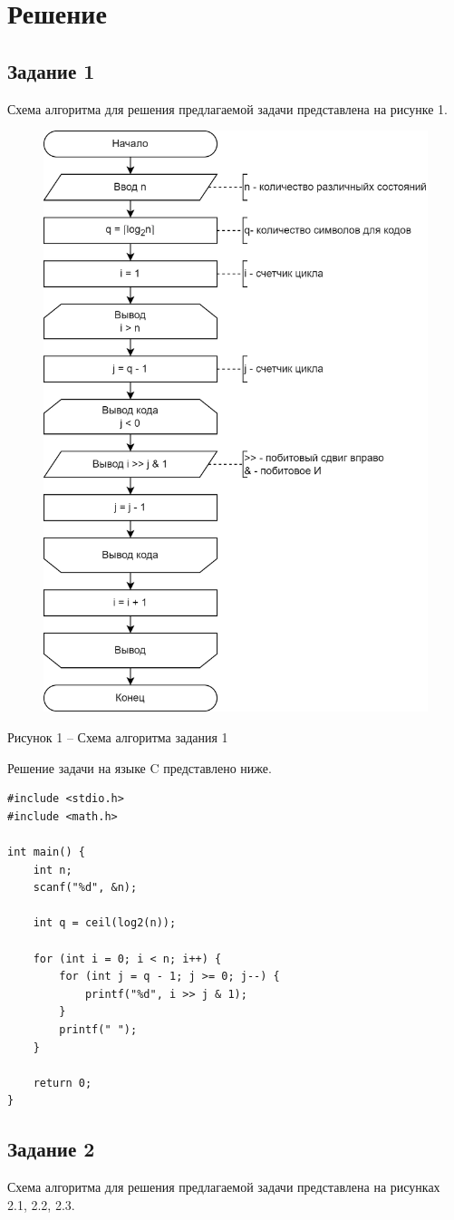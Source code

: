 \documentclass[a4paper,14pt]{extarticle}
\begin{document}
	\newpage
	\section*{Решение}
	\subsection*{Задание 1}
	Схема алгоритма для решения предлагаемой задачи представлена на рисунке 1.
	\begin{figure}[h]
		\centering
		\includegraphics[width=0.6\linewidth]{schemes/s-1}
	\end{figure}
	\begin{center}
		Рисунок 1 – Схема алгоритма задания 1
	\end{center}
	
	\pagebreak
	Решение задачи на языке C представлено ниже.
	\begin{lstlisting}[tabsize=2,basicstyle=\ttfamily]
#include <stdio.h>
#include <math.h>

int main() {
	int n;
	scanf("%d", &n);
	
	int q = ceil(log2(n));
	
	for (int i = 0; i < n; i++) {
		for (int j = q - 1; j >= 0; j--) {
			printf("%d", i >> j & 1);
		}
		printf(" ");
	}
	
	return 0;
}
	\end{lstlisting}
	
	\newpage
	\subsection*{Задание 2}
	Схема алгоритма для решения предлагаемой задачи представлена на рисунках 2.1, 2.2, 2.3.
	
\end{document}
